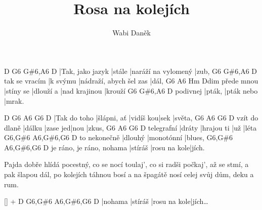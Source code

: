 \documentclass{song}
\title{Rosa na kolejích}
\author{Wabi Daněk}
\begin{document}
\strophe
D                G6    G\#6,A6              D
|Tak, jako jazyk |stále |naráží na vylomený |zub,
              G6      G\#6,A6                  D
tak se vracím |k svýmu |nádraží, abych šel zas |dál,
           G6        A6        Hm            Ddim
přede mnou |stíny se |dlouží a |nad krajinou |krouží
         G6     G\#6,A6    D
podivnej |pták, |pták nebo |mrak.
\endstrophe

D            G6          A6        G6   D
|Tak do toho |šlápni, ať |vidíš kou|sek |světa,
              G6     A6       G6   D
vzít do dlaně |dálku |zase jed|nou |zkus,
           G6     A6         G6  D
telegrafní |dráty |hrajou ti |už |léta
             G6,G\#6 A6,G\#6,G6 D
to nekonečně |dlouhý |monotónní |blues,
                         G6,G\#6 A6,G\#6,G6   D
je ráno, je ráno, nohama |stíráš |rosu na kole|jích.
\endstrophe

\strophe*
Pajda dobře hlídá pocestný, co se nocí toulaj', 
co si radši počkaj', až se stmí, a pak šlapou dál, 
po kolejích táhnou bosí a na špagátě nosí 
celej svůj dům, deku a rum.
\endstrophe

\ref{} + \strophe
D       G6,G\#6 A6,G\#6,G6   D
|nohama |stíráš |rosu na kole|jích\ldots
\endstrophe
\end{document}
